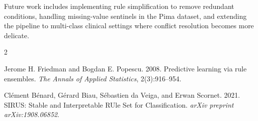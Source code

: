 \documentclass[11pt]{article}
\begin{document}
Future work includes implementing rule simplification to remove redundant conditions, handling missing-value sentinels in the Pima dataset, and extending the pipeline to multi-class clinical settings where conflict resolution becomes more delicate.



\begin{thebibliography}{2}

Jerome H. Friedman and Bogdan E. Popescu. 2008. Predictive learning via rule ensembles. \textit{The Annals of Applied Statistics}, 2(3):916--954.

Cl\'ement B\'enard, G\'erard Biau, S\'ebastien da Veiga, and Erwan Scornet. 2021. SIRUS: Stable and Interpretable RUle Set for Classification. \textit{arXiv preprint arXiv:1908.06852}.

\end{thebibliography}
\end{document}
